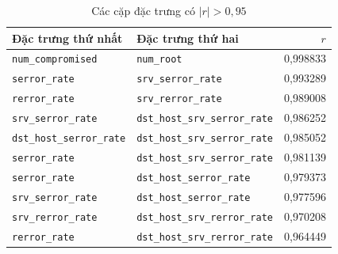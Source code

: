 \documentclass[../main.tex]{subfiles}
\begin{document}
\begin{table}[htbp]
\centering
\caption{Các cặp đặc trưng có $|r|>0{,}95$}
\label{tab:t31:highcorr}
\small
\begin{tabularx}{\linewidth}{@{}>{\raggedright\arraybackslash}X>{\raggedright\arraybackslash}Xr@{}}
\toprule
Đặc trưng thứ nhất & Đặc trưng thứ hai & $r$\\
\midrule
\texttt{num\_compromised} & \texttt{num\_root} & 0{,}998833\\
\texttt{serror\_rate} & \texttt{srv\_serror\_rate} & 0{,}993289\\
\texttt{rerror\_rate} & \texttt{srv\_rerror\_rate} & 0{,}989008\\
\texttt{srv\_serror\_rate} & \texttt{dst\_host\_srv\_serror\_rate} & 0{,}986252\\
\texttt{dst\_host\_serror\_rate} & \texttt{dst\_host\_srv\_serror\_rate} & 0{,}985052\\
\texttt{serror\_rate} & \texttt{dst\_host\_srv\_serror\_rate} & 0{,}981139\\
\texttt{serror\_rate} & \texttt{dst\_host\_serror\_rate} & 0{,}979373\\
\texttt{srv\_serror\_rate} & \texttt{dst\_host\_serror\_rate} & 0{,}977596\\
\texttt{srv\_rerror\_rate} & \texttt{dst\_host\_srv\_rerror\_rate} & 0{,}970208\\
\texttt{rerror\_rate} & \texttt{dst\_host\_srv\_rerror\_rate} & 0{,}964449\\
\bottomrule
\end{tabularx}
\end{table}
\end{document}
